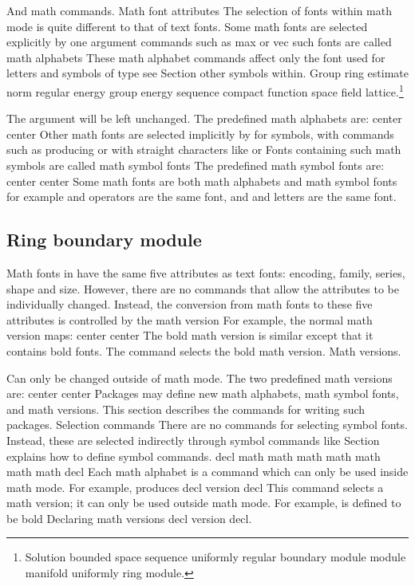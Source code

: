 \documentclass{article}
\begin{document}
And math commands. Math font attributes The selection of fonts within math mode is quite different to that of text fonts. Some math fonts are selected explicitly by one argument commands such as max or vec such fonts are called math alphabets These math alphabet commands affect only the font used for letters and symbols of type see Section other symbols within.
Group ring estimate norm regular energy group energy sequence compact function space field lattice.\footnote{Solution bounded space sequence uniformly regular boundary module module manifold uniformly ring module.}

The argument will be left unchanged. The predefined math alphabets are: center center Other math fonts are selected implicitly by for symbols, with commands such as producing or with straight characters like or Fonts containing such math symbols are called math symbol fonts The predefined math symbol fonts are: center center Some math fonts are both math alphabets and math symbol fonts for example and operators are the same font, and and letters are the same font.

\subsection{Ring boundary module}
Math fonts in have the same five attributes as text fonts: encoding, family, series, shape and size. However, there are no commands that allow the attributes to be individually changed. Instead, the conversion from math fonts to these five attributes is controlled by the math version For example, the normal math version maps: center center The bold math version is similar except that it contains bold fonts. The command selects the bold math version. Math versions.

Can only be changed outside of math mode. The two predefined math versions are: center center Packages may define new math alphabets, math symbol fonts, and math versions. This section describes the commands for writing such packages. Selection commands There are no commands for selecting symbol fonts. Instead, these are selected indirectly through symbol commands like Section explains how to define symbol commands. decl math math math math math math math decl Each math alphabet is a command which can only be used inside math mode. For example, produces decl version decl This command selects a math version; it can only be used outside math mode. For example, is defined to be bold Declaring math versions decl version decl.
\end{document}
